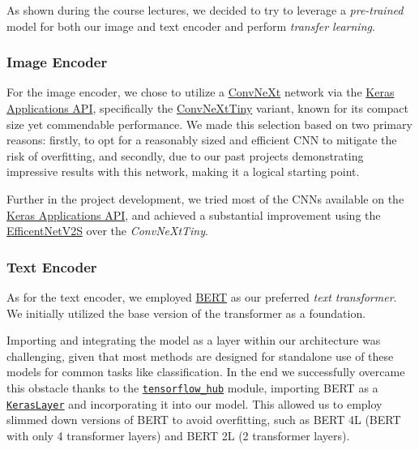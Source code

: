 \documentclass[10pt,twocolumn,letterpaper]{article}
\begin{document}
As shown during the course lectures, we decided to try to leverage a \textit{pre-trained} model for both our image and text encoder and perform \textit{transfer learning}.

\subsubsection{Image Encoder}
For the image encoder, we chose to utilize a \href{https://github.com/facebookresearch/ConvNeXt}{ConvNeXt} network via the \href{https://keras.io/api/applications/}{Keras Applications API}, specifically the \href{https://keras.io/api/applications/convnext/#convnexttiny-function}{ConvNeXtTiny} variant, known for its compact size yet commendable performance.
We made this selection based on two primary reasons: firstly, to opt for a reasonably sized and efficient CNN to mitigate the risk of overfitting, and secondly, due to our past projects demonstrating impressive results with this network, making it a logical starting point.

Further in the project development, we tried most of the CNNs available on the \href{https://keras.io/api/applications/}{Keras Applications API}, and achieved a substantial improvement using the \href{https://keras.io/api/applications/efficientnet_v2/#efficientnetv2s-function}{EfficentNetV2S} over the \textit{ConvNeXtTiny}.

\subsubsection{Text Encoder}
As for the text encoder, we employed \href{https://huggingface.co/docs/transformers/model_doc/bert}{BERT} as our preferred \textit{text transformer}.
We initially utilized the base version of the transformer as a foundation.

Importing and integrating the model as a layer within our architecture was challenging, given that most methods are designed for standalone use of these models for common tasks like classification.
In the end we successfully overcame this obstacle thanks to the \href{https://www.tensorflow.org/hub}{\texttt{tensorflow\_hub}} module, importing BERT as a \href{https://www.tensorflow.org/hub/api_docs/python/hub/KerasLayer}{\texttt{KerasLayer}} and incorporating it into our model. This allowed us to employ slimmed down versions of BERT to avoid overfitting, such as BERT 4L (BERT with only 4 transformer layers) and BERT 2L (2 transformer layers).
\end{document}

